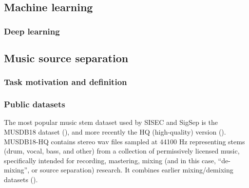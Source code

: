 \documentclass[report.tex]{subfiles}
\begin{document}




\newpagefill

\subsection{Machine learning}
\label{sec:ml}



\subsubsection{Deep learning}
\label{sec:dl}

\newpagefill

\subsection{Music source separation}
\label{sec:musicsep}

\subsubsection{Task motivation and definition}


\subsubsection{Public datasets}

The most popular music stem dataset used by SISEC and SigSep is the MUSDB18 dataset (\cite{musdb18}), and more recently the HQ (high-quality) version (\cite{musdb18hq}). MUSDB18-HQ contains stereo wav files sampled at 44100 Hz representing stems (drum, vocal, bass, and other) from a collection of permissively licensed music, specifically intended for recording, mastering, mixing (and in this case, ``de-mixing'', or source separation) research. It combines earlier mixing/demixing datasets (\cite{otherdataset1, otherdataset2}).
\end{document}
